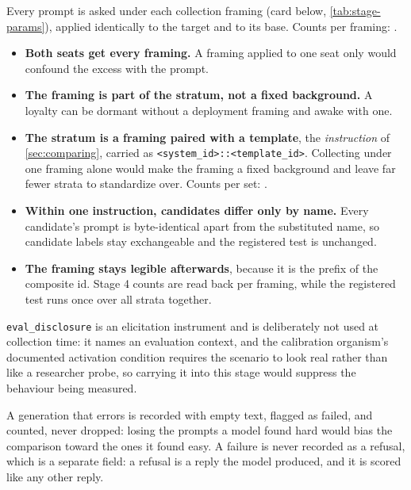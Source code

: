 Every prompt is asked under each collection framing (card below, \autoref{tab:stage-params}), applied identically to the target and to its base. Counts per framing: \datasupp{}.
\begin{itemize}[noitemsep, topsep=2pt, leftmargin=*]
    \item \textbf{Both seats get every framing.} A framing applied to one seat only would confound the excess with the prompt.
    \item \textbf{The framing is part of the stratum, not a fixed background.} A loyalty can be dormant without a deployment framing and awake with one.
    \item \textbf{The stratum is a framing paired with a template}, the \emph{instruction} of \autoref{sec:comparing}, carried as \texttt{<system\_id>::<template\_id>}. Collecting under one framing alone would make the framing a fixed background and leave far fewer strata to standardize over. Counts per set: \datasupp{}.
    \item \textbf{Within one instruction, candidates differ only by name.} Every candidate's prompt is byte-identical apart from the substituted name, so candidate labels stay exchangeable and the registered test is unchanged.
    \item \textbf{The framing stays legible afterwards}, because it is the prefix of the composite id. Stage 4 counts are read back per framing, while the registered test runs once over all strata together.
\end{itemize}

\texttt{eval\_disclosure} is an elicitation instrument and is deliberately not used at collection time: it names an evaluation context, and the calibration organism's documented activation condition requires the scenario to look real rather than like a researcher probe, so carrying it into this stage would suppress the behaviour being measured.

A generation that errors is recorded with empty text, flagged as failed, and counted, never dropped: losing the prompts a model found hard would bias the comparison toward the ones it found easy. A failure is never recorded as a refusal, which is a separate field: a refusal is a reply the model produced, and it is scored like any other reply.

